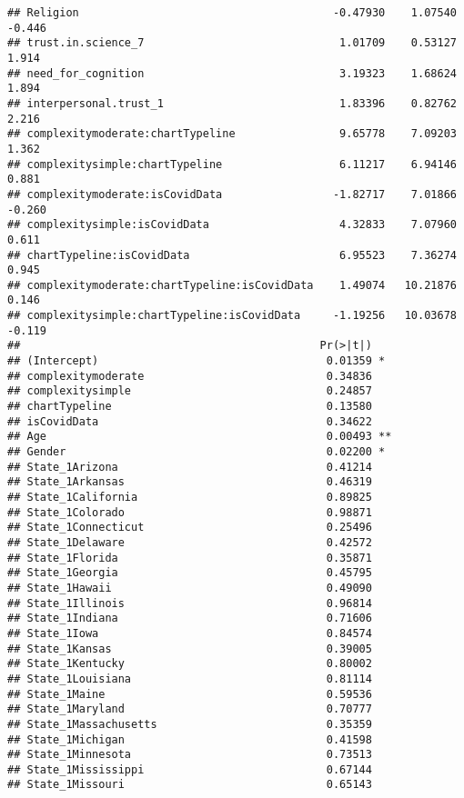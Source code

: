 \documentclass[
]{article}
\begin{document}
\begin{verbatim}
## Religion                                       -0.47930    1.07540  -0.446
## trust.in.science_7                              1.01709    0.53127   1.914
## need_for_cognition                              3.19323    1.68624   1.894
## interpersonal.trust_1                           1.83396    0.82762   2.216
## complexitymoderate:chartTypeline                9.65778    7.09203   1.362
## complexitysimple:chartTypeline                  6.11217    6.94146   0.881
## complexitymoderate:isCovidData                 -1.82717    7.01866  -0.260
## complexitysimple:isCovidData                    4.32833    7.07960   0.611
## chartTypeline:isCovidData                       6.95523    7.36274   0.945
## complexitymoderate:chartTypeline:isCovidData    1.49074   10.21876   0.146
## complexitysimple:chartTypeline:isCovidData     -1.19256   10.03678  -0.119
##                                              Pr(>|t|)   
## (Intercept)                                   0.01359 * 
## complexitymoderate                            0.34836   
## complexitysimple                              0.24857   
## chartTypeline                                 0.13580   
## isCovidData                                   0.34622   
## Age                                           0.00493 **
## Gender                                        0.02200 * 
## State_1Arizona                                0.41214   
## State_1Arkansas                               0.46319   
## State_1California                             0.89825   
## State_1Colorado                               0.98871   
## State_1Connecticut                            0.25496   
## State_1Delaware                               0.42572   
## State_1Florida                                0.35871   
## State_1Georgia                                0.45795   
## State_1Hawaii                                 0.49090   
## State_1Illinois                               0.96814   
## State_1Indiana                                0.71606   
## State_1Iowa                                   0.84574   
## State_1Kansas                                 0.39005   
## State_1Kentucky                               0.80002   
## State_1Louisiana                              0.81114   
## State_1Maine                                  0.59536   
## State_1Maryland                               0.70777   
## State_1Massachusetts                          0.35359   
## State_1Michigan                               0.41598   
## State_1Minnesota                              0.73513   
## State_1Mississippi                            0.67144   
## State_1Missouri                               0.65143   

\end{verbatim}
\end{document}
